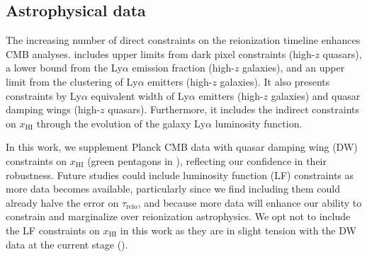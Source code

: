 \documentclass[12pt, a4paper]{article}
\newcommand{\HI}{\mathrm{HI}}
\newcommand{\reio}{\mathrm{reio}}
\begin{document}
\subsection*{Astrophysical data}
\label{sec:xHI}

The increasing number of direct constraints on the reionization timeline
enhances CMB analyses.
 includes upper limits from dark pixel
constraints\cite{Jin2023} (high-$z$ quasars), a lower bound from the
Ly$\alpha$ emission fraction\cite{Mesinger2015} (high-$z$ galaxies), and
an upper limit from the clustering of Ly$\alpha$
emitters\cite{Sobacchi2015} (high-$z$ galaxies).
It also presents constraints by Ly$\alpha$ equivalent width of
Ly$\alpha$ emitters\cite{Mason2018, Mason2019, Hoag2019} (high-$z$
galaxies) and quasar damping wings\cite{Greig2022, Greig2024, Spina2024,
Durovcikova2024} (high-$z$ quasars).
Furthermore, it includes the indirect constraints on $x_\HI$ through the
evolution of the galaxy Ly$\alpha$ luminosity
function\cite{Morales2021}.

In this work, we supplement Planck CMB data with quasar damping wing
(DW) constraints on $x_\HI$ (green pentagons in ),
reflecting our confidence in their robustness.
Future studies could include luminosity function (LF) constraints as
more data becomes available, particularly since we find including them
could already halve the error on $\tau_\reio$, and because more data
will enhance our ability to constrain and marginalize over reionization
astrophysics.
We opt not to include the LF constraints on $x_\HI$ in this work as they
are in slight tension with the DW data at the current stage
().
\end{document}
